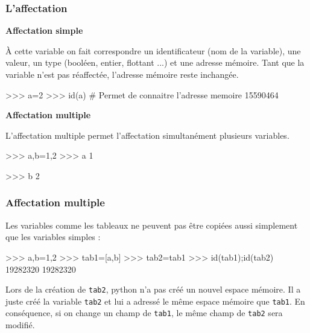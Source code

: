 \begin{frame}[fragile]
\frametitle{L'affectation}

\textbf{Affectation simple}

À cette variable on fait correspondre un identificateur (nom de la variable), une valeur, un type (booléen, entier, flottant ...) et une adresse mémoire. Tant que la variable n'est pas réaffectée, l'adresse mémoire reste inchangée.

\begin{GrayBox}[0.75\textwidth]
\begin{verbatimtab}[3]
>>> a=2
>>> id(a) # Permet de connaitre l'adresse memoire
	15590464
\end{verbatimtab}
\end{GrayBox}

\textbf{Affectation multiple}

L'affectation multiple permet l'affectation simultanément plusieurs variables.

\vspace{-0.5cm}

\begin{GrayBox}[0.75\textwidth]
\begin{minipage}[t]{0.4\linewidth}
\begin{verbatimtab}[3]
>>> a,b=1,2
>>> a
	1
\end{verbatimtab}
\end{minipage}\hfill
\begin{minipage}[t]{0.4\linewidth}
\begin{verbatimtab}[3]
>>> b
	2
\end{verbatimtab}
\end{minipage}
\end{GrayBox}



\end{frame}

\begin{frame}[fragile]
\frametitle{Affectation multiple}

Les variables comme les tableaux ne peuvent pas être copiées aussi simplement que les variables simples :
\begin{GrayBox}[0.75\textwidth]
\begin{verbatimtab}[3]
>>> a,b=1,2
>>> tab1=[a,b]
>>> tab2=tab1
>>> id(tab1);id(tab2)
	19282320
	19282320
\end{verbatimtab}
\end{GrayBox}

Lors de la création de \verb|tab2|, python n'a pas créé un nouvel espace mémoire. Il a juste créé la variable \verb|tab2| et lui a adressé le même espace mémoire que \verb|tab1|. En conséquence, si on change un champ de \verb|tab1|, le même champ de \verb|tab2| sera modifié.
\end{frame}

